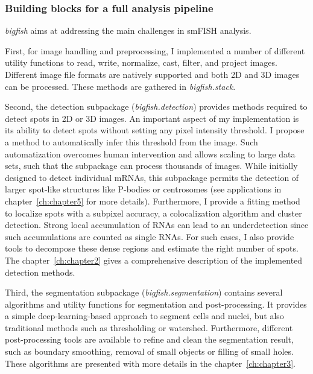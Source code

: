 \subsubsection{Building blocks for a full analysis pipeline}

\emph{bigfish} aims at addressing the main challenges in \ac{smFISH} analysis.

First, for image handling and preprocessing, I implemented a number of different utility functions to read, write, normalize, cast, filter, and project images.
Different image file formats are natively supported and both 2D and 3D images can be processed.
These methods are gathered in \emph{bigfish.stack}. 

Second, the detection subpackage (\emph{bigfish.detection}) provides methods required to detect spots in 2D or 3D images.
An important aspect of my implementation is its ability to detect spots without setting any pixel intensity threshold.
I propose a method to automatically infer this threshold from the image.
Such automatization overcomes human intervention and allows scaling to large data sets, such that the subpackage can process thousands of images.
While initially designed to detect individual \ac{mRNA}s, this subpackage permits the detection of larger spot-like structures like P-bodies or centrosomes (see applications in chapter~\ref{ch:chapter5} for more details).
Furthermore, I provide a fitting method to localize spots with a subpixel accuracy, a colocalization algorithm and cluster detection.
Strong local accumulation of \ac{RNA}s can lead to an underdetection since such accumulations are counted as single \ac{RNA}s.
For such cases, I also provide tools to decompose these dense regions and estimate the right number of spots.
The chapter~\ref{ch:chapter2} gives a comprehensive description of the implemented detection methods.

Third, the segmentation subpackage (\emph{bigfish.segmentation}) contains several algorithms and utility functions for segmentation and post-processing.
It provides a simple deep-learning-based approach to segment cells and nuclei, but also traditional methods such as thresholding or watershed.
Furthermore, different post-processing tools are available to refine and clean the segmentation result, such as boundary smoothing, removal of small objects or filling of small holes.
These algorithms are presented with more details in the chapter~\ref{ch:chapter3}.


